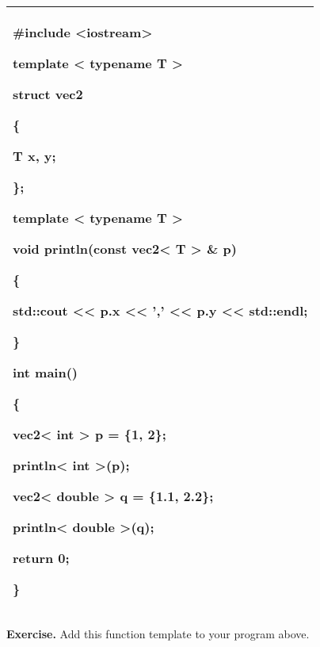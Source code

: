 \documentclass[
]{article}
\begin{document}
\begin{longtable}[]{@{}l@{}}
\toprule
\endhead
\begin{minipage}[t]{0.97\columnwidth}\raggedright
\#include \textless iostream\textgreater{}

template \textless{} typename T \textgreater{}

struct vec2

\{

T x, y;

\};

template \textless{} typename T \textgreater{}

void println(const vec2\textless{} T \textgreater{} \& p)

\{

std::cout \textless\textless{} p.x \textless\textless{} ','
\textless\textless{} p.y \textless\textless{} std::endl;

\}

int main()

\{

vec2\textless{} int \textgreater{} p = \{1, 2\};

println\textless{} int \textgreater(p);

vec2\textless{} double \textgreater{} q = \{1.1, 2.2\};

println\textless{} double \textgreater(q);

return 0;

\}\strut
\end{minipage}\tabularnewline
\bottomrule
\end{longtable}

\textbf{Exercise.} Add this function template to your program above.
\end{document}
